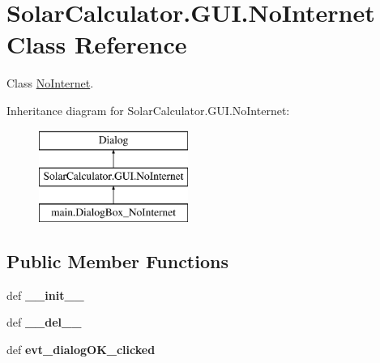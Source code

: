 \hypertarget{class_solar_calculator_1_1_g_u_i_1_1_no_internet}{\section{Solar\-Calculator.\-G\-U\-I.\-No\-Internet Class Reference}
\label{class_solar_calculator_1_1_g_u_i_1_1_no_internet}
}


Class \hyperlink{class_solar_calculator_1_1_g_u_i_1_1_no_internet}{No\-Internet}.  


Inheritance diagram for Solar\-Calculator.\-G\-U\-I.\-No\-Internet\-:\begin{figure}[H]
\begin{center}
\leavevmode
\includegraphics[height=3.000000cm]{class_solar_calculator_1_1_g_u_i_1_1_no_internet}
\end{center}
\end{figure}
\subsection*{Public Member Functions}
\begin{DoxyCompactItemize}
\item 
\hypertarget{class_solar_calculator_1_1_g_u_i_1_1_no_internet_ac01cf3a78ef351f279d5457d8ceb9cc4}{def {\bfseries \-\_\-\-\_\-init\-\_\-\-\_\-}}\label{class_solar_calculator_1_1_g_u_i_1_1_no_internet_ac01cf3a78ef351f279d5457d8ceb9cc4}

\item 
\hypertarget{class_solar_calculator_1_1_g_u_i_1_1_no_internet_ad2f27212d56da3d69d6bb35ed776bb99}{def {\bfseries \-\_\-\-\_\-del\-\_\-\-\_\-}}\label{class_solar_calculator_1_1_g_u_i_1_1_no_internet_ad2f27212d56da3d69d6bb35ed776bb99}

\item 
\hypertarget{class_solar_calculator_1_1_g_u_i_1_1_no_internet_a8e048e8fe86a468baf9d1810d8b959de}{def {\bfseries evt\-\_\-dialog\-O\-K\-\_\-clicked}}\label{class_solar_calculator_1_1_g_u_i_1_1_no_internet_a8e048e8fe86a468baf9d1810d8b959de}

\end{DoxyCompactItemize}
